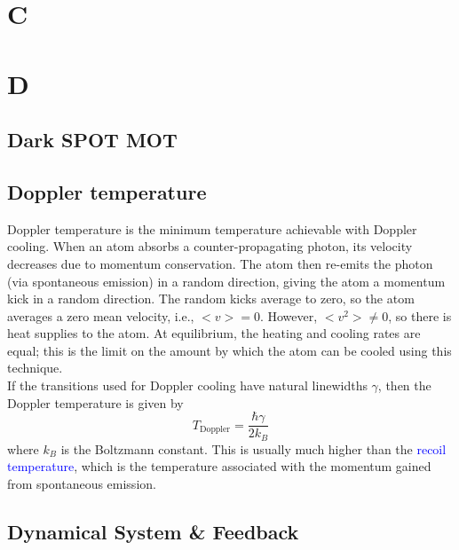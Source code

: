 \documentclass{book}
\theoremstyle{definition}
\newcommand{\f}[2]{\frac{#1}{#2}}
\begin{document}
\chapter*{C}
\chapter*{D}



\section*{Dark SPOT MOT}





\section*{Doppler temperature}


Doppler temperature is the minimum temperature achievable with Doppler cooling. When an atom absorbs a counter-propagating photon, its velocity decreases due to momentum conservation. The atom then re-emits the photon (via spontaneous emission) in a random direction, giving the atom a momentum kick in a random direction. The random kicks average to zero, so the atom averages a zero mean velocity, i.e., $< v > = 0$. However, $<v^2> \neq 0$, so there is heat supplies to the atom. At equilibrium, the heating and cooling rates are equal; this is the limit on the amount by which the atom can be cooled using this technique. \\

If the transitions used for Doppler cooling have natural linewidths $\gamma$, then the Doppler temperature is given by 
\begin{equation*}
T_\text{Doppler} = \f{\hbar \gamma}{2k_B}
\end{equation*} 
where $k_B$ is the Boltzmann constant. This is usually much higher than the \textcolor{blue}{recoil temperature}, which is the temperature associated with the momentum gained from spontaneous emission. 






\section*{Dynamical System \& Feedback}
\end{document}
